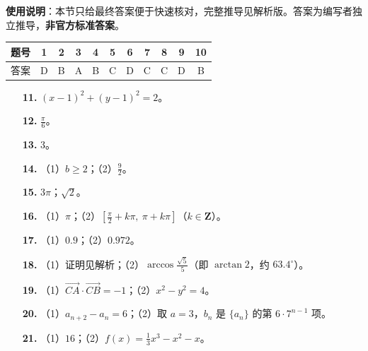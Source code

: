 
\begin{gknotice}
\textbf{使用说明}：本节只给最终答案便于快速核对，完整推导见解析版。答案为编写者独立推导，\textbf{非官方标准答案}。
\end{gknotice}

\begin{center}\begin{tabular}{ccccccccccc}
\toprule
题号 & 1 & 2 & 3 & 4 & 5 & 6 & 7 & 8 & 9 & 10 \\
\midrule
答案 & D & B & A & B & C & D & C & C & D & B \\
\bottomrule
\end{tabular}\end{center}

\begin{itemize}[leftmargin=2.6em]
  \item[\textbf{11.}] $(x-1)^2+(y-1)^2=2$。
  \item[\textbf{12.}] $\frac{\pi}{6}$。
  \item[\textbf{13.}] $3$。
  \item[\textbf{14.}] （1）$b\geqslant2$；（2）$\frac92$。
  \item[\textbf{15.}] $3\pi$；$\sqrt2$。
  \item[\textbf{16.}] （1）$\pi$；（2）$\left[\frac{\pi}{2}+k\pi,\ \pi+k\pi\right]$（$k\in\mathbf Z$）。
\end{itemize}

\begin{itemize}[leftmargin=2.6em]
  \item[\textbf{17.}] （1）$0.9$；（2）$0.972$。
  \item[\textbf{18.}] （1）证明见解析；（2）$\arccos\frac{\sqrt5}{5}$（即 $\arctan2$，约 $63.4^\circ$）。
  \item[\textbf{19.}] （1）$\overrightarrow{CA}\cdot\overrightarrow{CB}=-1$；（2）$x^2-y^2=4$。
  \item[\textbf{20.}] （1）$a_{n+2}-a_n=6$；（2）取 $a=3$，$b_n$ 是 $\{a_n\}$ 的第 $6\cdot7^{n-1}$ 项。
  \item[\textbf{21.}] （1）$16$；（2）$f(x)=\frac13x^3-x^2-x$。
\end{itemize}

